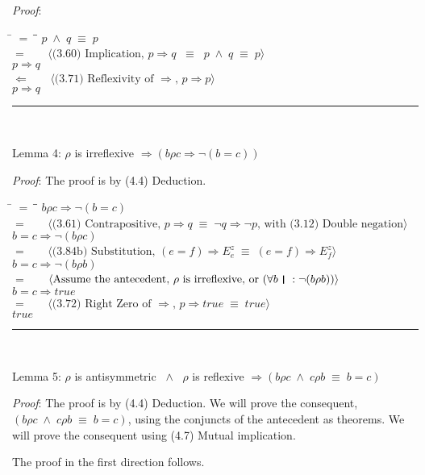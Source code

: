\documentclass[12pt, fleqn, leqno]{article}
\newcommand{\lgap}{2pt}                             %
\newcommand{\mymathindent}{24pt}                    %
\newcommand{\equivs}{\ensuremath{\;\equiv\;}}       %
\newcommand{\equivss}{\ensuremath{\;\;\equiv\;\;}}  %
\newcommand{\lands}{\ensuremath{\;\land\;}}      %
\newcommand{\impl}{\ensuremath{\Rightarrow}}        %
\newcommand{\foll}{\ensuremath{\Leftarrow}}         %
\newcommand{\myqed}{\rule[-.23ex]{1.2ex}{2.0ex}}
\newcommand{\myqedtab}{\hspace{384pt}}              %
\newcommand{\thedr}{\rule[-.25ex]{.32mm}{1.75ex}}   %
\newcommand{\dr}{\;\,\thedr\,\;}                    %
\newcommand{\rb}{:}                                 %
\newcommand{\all}{\forall}                          %
\newcommand{\Gll} {\langle}                         %
\newcommand{\Ggg} {\rangle}                         %
\newcommand{\Hint}[1]     {\ \ \ $\Gll              \mbox{#1} \Ggg$ }   %
\begin{document}
\textit{Proof}:
\begin{tabbing}
\hspace{\mymathindent} \= $= \;$ \= \myqedtab \= \kill
	\> \>  $p \lands q \equivs p$\\
	\> $=$  \>  \Hint{(3.60) Implication, $p \impl q \equivss p \lands q \equivs p$}\\[\lgap]
	\> \>   $p \impl q$\\
	\> $\foll$  \>  \Hint{(3.71) Reflexivity of $\impl$, $p \impl p$}\\[\lgap]
	\> \>   $p \impl q$ \quad \myqed\\
\end{tabbing}

Lemma 4: $\rho$ is irreflexive $\impl (b \rho c \impl \lnot (b = c))$

\textit{Proof}: The proof is by (4.4) Deduction.
\begin{tabbing}
\hspace{\mymathindent} \= $= \;$ \= \myqedtab \= \kill
	\> \>  $b \rho c \impl \lnot (b = c)$\\
	\> $=$  \>  \Hint{(3.61) Contrapositive, $p \impl q \equivs \lnot q \impl \lnot p$, with (3.12) Double negation}\\[\lgap]
	\> \>   $b = c \impl \lnot (b \rho c)$\\
	\> $=$  \>  \Hint{(3.84b) Substitution, $(e = f) \impl E^z_e \equivs (e = f) \impl E^z_f$}\\[\lgap]
	\> \>   $b = c \impl \lnot (b \rho b)$\\
	\> $=$  \>  \Hint{Assume the antecedent, $\rho$ is irreflexive, or $(\all b \dr \rb \lnot (b \rho b))$}\\[\lgap]
	\> \>   $b = c \impl true$\\
	\> $=$  \>  \Hint{(3.72) Right Zero of $\impl$, $p \impl true \equivs true$}\\[\lgap]
	\> \>   $true$ \quad \myqed\\
\end{tabbing}

Lemma 5: $\rho$ is antisymmetric $\lands$ $\rho$ is reflexive $\impl (b \rho c \lands c \rho b \equivs b = c)$

\textit{Proof}: The proof is by (4.4) Deduction. We will prove the consequent, $(b \rho c \lands c \rho b \equivs b = c)$, using the conjuncts of the antecedent as theorems. We will prove the consequent using (4.7) Mutual implication.

The proof in the first direction follows.
\end{document}
